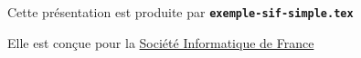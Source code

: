   \item Cette présentation est produite par \texttt{\textbf{exemple-sif-simple.tex}}
  \item Elle est conçue pour la \href{https://www.societe-informatique-de-france.fr}{Société Informatique de France}
